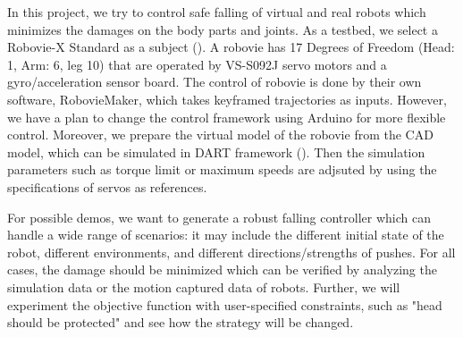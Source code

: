 In this project, we try to control safe falling of virtual and real robots
which minimizes the damages on the body parts and joints.
As a testbed, we select a Robovie-X Standard \cite{Robovie} as a subject
().
A robovie has 17 Degrees of Freedom (Head: 1, Arm: 6, leg 10) 
that are operated by VS-S092J servo motors and a gyro/acceleration sensor board.
The control of robovie is done by their own software, RobovieMaker, 
which takes keyframed trajectories as inputs.
However, we have a plan to change the control framework using Arduino 
for more flexible control.
Moreover, we prepare the virtual model of the robovie from the CAD model,
which can be simulated in DART framework \cite{Dart} ().
Then the simulation parameters such as torque limit or maximum speeds are 
adjsuted by using the specifications of servos as references.

For possible demos, we want to generate a robust falling controller 
which can handle a wide range of scenarios:
it may include the different initial state of the robot, different environments, 
and different directions/strengths of pushes.
For all cases, the damage should be minimized which can be verified by 
analyzing the simulation data or the motion captured data of robots.
Further, we will experiment the objective function with user-specified constraints, 
such as "head should be protected" and see how the strategy will be changed.




